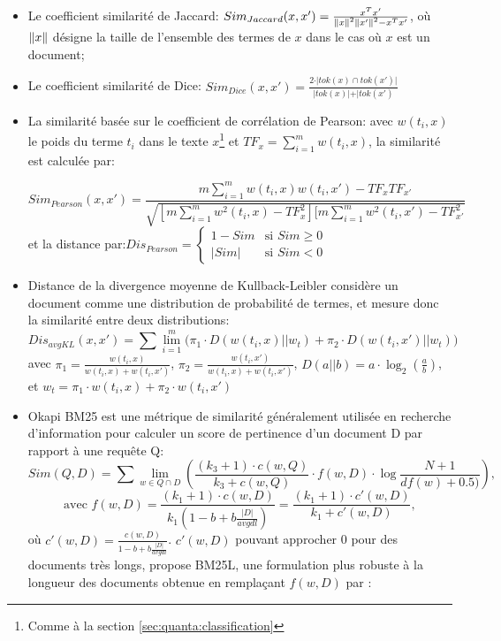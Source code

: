 \begin{itemize}
	\item Le coefficient similarité de Jaccard: $Sim_{Jaccard}(x,x') = \frac{x^Tx'}{\left\lVert x\right\rVert^2\left\lVert x'\right\rVert^2 - x^Tx'}$, où $\left\lVert x\right\rVert$ désigne la taille de l'ensemble des termes de $x$ dans le cas où $x$ est un document;
	\item Le coefficient similarité de Dice: $Sim_{Dice}(x,x') = \frac{2\cdot \vert tok(x) \cap tok(x') \vert}{\vert tok(x) \vert + \vert tok(x')} $
	\item La similarité basée sur le coefficient de corrélation de Pearson: avec $w(t_i,x)$ le poids du terme $t_i$ dans le texte $x$\footnote{Comme à la section \ref{sec:quanta:classification}} et $TF_x = \sum\limits^m_{i=1} w(t_i,x)$, la similarité est calculée par:
	
	\[Sim_{Pearson}(x,x') = \frac{m \sum\limits^m_{i=1} w(t_i,x) w(t_i,x') - TF_xTF_{x'}}{\sqrt{[m \sum\limits^m_{i=1} w^2(t_i,x) - TF^2_x][m \sum\limits^m_{i=1} w^2(t_i,x') - TF^2_{x'}}}\]
et la distance par:$
Dis_{Pearson} =
\left\{ \begin{array}{ll}
1 - Sim & \text{si } Sim \geq 0 \\
\vert Sim \vert & \text{si } Sim < 0
\end{array}
\right.$
	\item Distance de la divergence moyenne de Kullback-Leibler considère un document comme une distribution de probabilité de termes, et mesure donc la similarité entre deux distributions: 
	\[Dis_{avgKL}(x,x') = \sum\lim\limits_{i=1}^m\big(\pi_1 \cdot D(w(t_i,x) \vert\vert w_t) + \pi_2 \cdot D(w(t_i,x') \vert\vert w_t) \big)\]
	avec $\pi_1 = \frac{w(t_i,x)}{w(t_i,x) + w(t_i,x')}$, $\pi_2 = \frac{w(t_i,x')}{w(t_i,x) + w(t_i,x')}$, $D(a \vert\vert b) = a\cdot  \log_2(\frac{a}{b})$, et $w_t = \pi_1 \cdot w(t_i,x) + \pi_2 \cdot w(t_i,x')$
	\item Okapi BM25 est une métrique de similarité généralement utilisée en recherche d'information pour calculer un score de pertinence d'un document D par rapport à une requête Q: 
	\[Sim(Q,D) = \sum\lim\limits_{w \in Q \cap D} \left( \frac{(k_3+1) \cdot c(w, Q)}{k_3 + c(w, Q)} \cdot f(w,D) \cdot \log \frac{N+1}{df(w) + 0.5)}\right),\]
	\[\text{avec } f(w,D) = \frac{(k_1+1)\cdot c(w,D)}{k_1(1-b+b\frac{\vert D \vert}{avgdl})} = \frac{(k_1+1)\cdot c'(w,D)}{k_1 + c'(w,D)},\] où $c'(w,D) = \frac{c(w,D)}{1-b+b\frac{\vert D \vert}{avgdl} }$. $c'(w,D)$ pouvant approcher 0 pour des documents très longs, \citet{Lv2011BM25L} propose BM25L, une formulation plus robuste à la longueur des documents obtenue en remplaçant $f(w,D)$ par :

\end{itemize}
